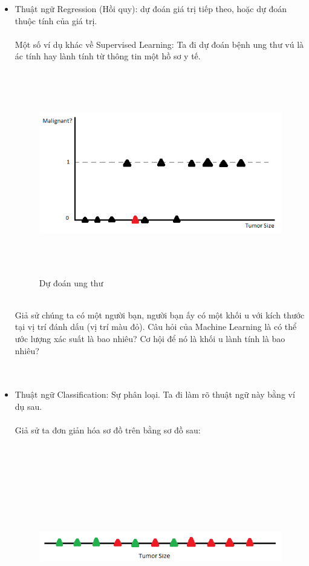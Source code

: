 \begin{itemize}
  \item Thuật ngữ Regression (Hồi quy): dự đoán giá trị tiếp theo, hoặc dự đoán
  thuộc tính của giá trị.\\\\
  Một số ví dụ khác về Supervised Learning: Ta đi dự đoán bệnh ung thư vú là ác
  tính hay lành tính từ thông tin một hồ sơ y tế.\\
  \begin{figure}[h!]
  	\centering
	\includegraphics[width=5in,height=3.5in,keepaspectratio=true]{HoiQuy.png}
	\caption{Dự đoán ung thư}
\end{figure}\\
  Giả sử chúng ta có một người bạn, người bạn ấy có một khối u với kích thước
  tại vị trí đánh dấu (vị trí màu đỏ). Câu hỏi của Machine Learning là có thể
  ước lượng xác suất là bao nhiêu? Cơ hội để nó là khối u lành tính là bao
  nhiêu?  \\\\\\
  \item Thuật ngữ Classification: Sự phân loại. Ta đi làm rõ thuật ngữ này bằng
  ví dụ sau.\\\\
   Giả sử ta đơn giản hóa sơ đồ trên bằng sơ đồ sau:
   \begin{figure}[h!]
  	\centering
	\includegraphics[width=6in,height=3.5in,keepaspectratio=true]{PhanLoai1.png}

\end{figure}
\end{itemize}
